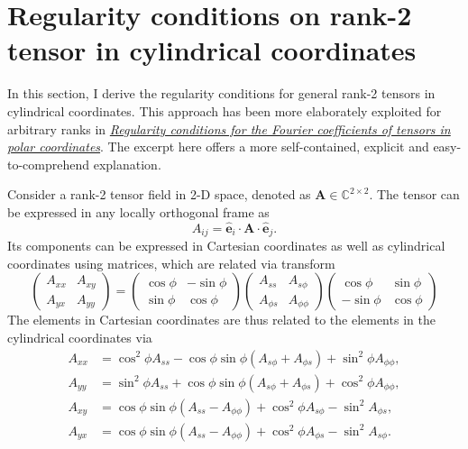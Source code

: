 \section{Regularity conditions on rank-2 tensor in cylindrical coordinates}

In this section, I derive the regularity conditions for general rank-2 tensors in cylindrical coordinates.
This approach has been more elaborately exploited for arbitrary ranks in \href{run:./regular_tensors_polar_coordinates.pdf}{\textit{Regularity conditions for the Fourier coefficients of tensors in polar coordinates}}. The excerpt here offers a more self-contained, explicit and easy-to-comprehend explanation.

Consider a rank-2 tensor field in 2-D space, denoted as $\mathbf{A} \in \mathbb{C}^{2\times 2}$. The tensor can be expressed in any locally orthogonal frame as
\[
    A_{ij} = \hat{\mathbf{e}}_i \cdot \mathbf{A} \cdot \hat{\mathbf{e}}_j.
\]
Its components can be expressed in Cartesian coordinates as well as cylindrical coordinates using matrices, which are related via transform
\[
    \begin{pmatrix} A_{xx} & A_{xy} \\ A_{yx} & A_{yy} \end{pmatrix} = 
    \begin{pmatrix} \cos\phi & -\sin\phi \\ \sin\phi & \cos\phi \end{pmatrix}
    \begin{pmatrix} A_{ss} & A_{s\phi} \\ A_{\phi s} & A_{\phi\phi} \end{pmatrix}
    \begin{pmatrix} \cos\phi & \sin\phi \\ -\sin\phi & \cos\phi \end{pmatrix}
\]
The elements in Cartesian coordinates are thus related to the elements in the cylindrical coordinates via
\[
    \begin{aligned}
        A_{xx} &= \cos^2\phi A_{ss} - \cos\phi \sin\phi \left(A_{s\phi} + A_{\phi s}\right) + \sin^2\phi A_{\phi\phi}, \\
        A_{yy} &= \sin^2\phi A_{ss} + \cos\phi \sin\phi \left(A_{s\phi} + A_{\phi s}\right) + \cos^2\phi A_{\phi\phi}, \\
        A_{xy} &= \cos\phi \sin\phi \left(A_{ss} - A_{\phi\phi}\right) + \cos^2\phi A_{s\phi} - \sin^2 A_{\phi s}, \\
        A_{yx} &= \cos\phi \sin\phi \left(A_{ss} - A_{\phi\phi}\right) + \cos^2\phi A_{\phi s} - \sin^2 A_{s \phi}.
    \end{aligned}
\]
